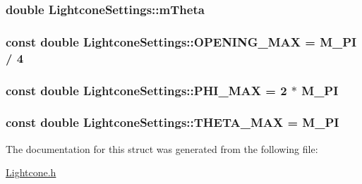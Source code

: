 \subsubsection[{m\+Theta}]{\setlength{\rightskip}{0pt plus 5cm}double Lightcone\+Settings\+::m\+Theta}\label{structLightconeSettings_a65ddb1d59b467d53f9df135fb5530008}
\hypertarget{structLightconeSettings_a84fe32a28ec1c71f5131bf79dde76b77}{}
\subsubsection[{O\+P\+E\+N\+I\+N\+G\+\_\+\+M\+A\+X}]{\setlength{\rightskip}{0pt plus 5cm}const double Lightcone\+Settings\+::\+O\+P\+E\+N\+I\+N\+G\+\_\+\+M\+A\+X = M\+\_\+\+P\+I / 4\hspace{0.3cm}{\ttfamily [static]}}\label{structLightconeSettings_a84fe32a28ec1c71f5131bf79dde76b77}
\hypertarget{structLightconeSettings_a482009f7c776c60272434870fd10a5e9}{}
\subsubsection[{P\+H\+I\+\_\+\+M\+A\+X}]{\setlength{\rightskip}{0pt plus 5cm}const double Lightcone\+Settings\+::\+P\+H\+I\+\_\+\+M\+A\+X = 2 $\ast$ M\+\_\+\+P\+I\hspace{0.3cm}{\ttfamily [static]}}\label{structLightconeSettings_a482009f7c776c60272434870fd10a5e9}
\hypertarget{structLightconeSettings_adc80dcb7ac50ce4ddb5fe1d0146f3006}{}
\subsubsection[{T\+H\+E\+T\+A\+\_\+\+M\+A\+X}]{\setlength{\rightskip}{0pt plus 5cm}const double Lightcone\+Settings\+::\+T\+H\+E\+T\+A\+\_\+\+M\+A\+X = M\+\_\+\+P\+I\hspace{0.3cm}{\ttfamily [static]}}\label{structLightconeSettings_adc80dcb7ac50ce4ddb5fe1d0146f3006}


The documentation for this struct was generated from the following file\+:\begin{DoxyCompactItemize}
\item 
\hyperlink{Lightcone_8h}{Lightcone.\+h}\end{DoxyCompactItemize}
